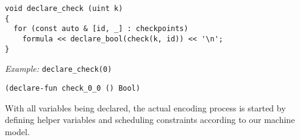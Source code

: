 

\begin{lstlisting}[style=c++]
void declare_check (uint k)
{
  for (const auto & [id, _] : checkpoints)
    formula << declare_bool(check(k, id)) << '\n';
}
\end{lstlisting}

\noindent
\emph{Example:} \lstinline[style=c++]{declare_check(0)}

\begin{lstlisting}[language=smtlib]
(declare-fun check_0_0 () Bool)
\end{lstlisting}

%
%


\noindent
With all variables being declared, the actual encoding process is started by defining helper variables and scheduling constraints according to our machine model.

